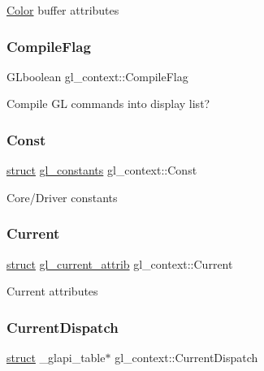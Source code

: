 \hyperlink{struct_color}{Color} buffer attributes \mbox{\label{structgl__context_a61c2ececfb345ad84ed3e53b6e61fc91}} 
\subsubsection{\texorpdfstring{Compile\+Flag}{CompileFlag}}
{\footnotesize\ttfamily G\+Lboolean gl\+\_\+context\+::\+Compile\+Flag}

Compile GL commands into display list? \mbox{\label{structgl__context_a225ea8c45facc3040c10c9460e031c04}} 
\subsubsection{\texorpdfstring{Const}{Const}}
{\footnotesize\ttfamily \hyperlink{interfacestruct}{struct} \hyperlink{structgl__constants}{gl\+\_\+constants} gl\+\_\+context\+::\+Const}

Core/\+Driver constants \mbox{\label{structgl__context_a7e896ebbbbd9fccb431e2b177e87229a}} 
\subsubsection{\texorpdfstring{Current}{Current}}
{\footnotesize\ttfamily \hyperlink{interfacestruct}{struct} \hyperlink{structgl__current__attrib}{gl\+\_\+current\+\_\+attrib} gl\+\_\+context\+::\+Current}

Current attributes \mbox{\label{structgl__context_a92b08ad6e43e67c060819301d498c7bc}} 
\subsubsection{\texorpdfstring{Current\+Dispatch}{CurrentDispatch}}
{\footnotesize\ttfamily \hyperlink{interfacestruct}{struct} \+\_\+glapi\+\_\+table$\ast$ gl\+\_\+context\+::\+Current\+Dispatch}

